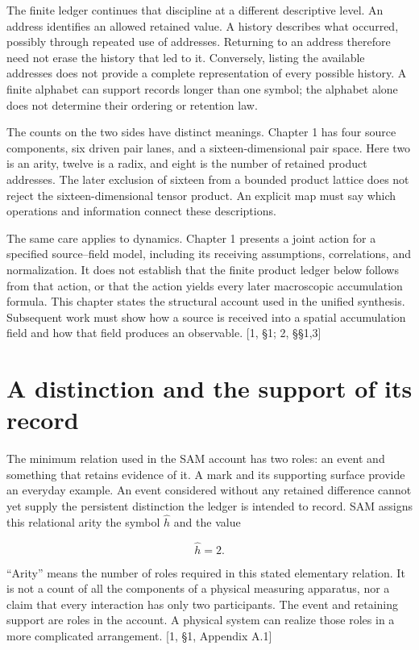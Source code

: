 \documentclass[10pt,twocolumn,letterpaper]{article}
\begin{document}
The finite ledger continues that discipline at a different descriptive level. An address identifies an allowed retained value. A history describes what occurred, possibly through repeated use of addresses. Returning to an address therefore need not erase the history that led to it. Conversely, listing the available addresses does not provide a complete representation of every possible history. A finite alphabet can support records longer than one symbol; the alphabet alone does not determine their ordering or retention law.

The counts on the two sides have distinct meanings. Chapter 1 has four source components, six driven pair lanes, and a sixteen-dimensional pair space. Here two is an arity, twelve is a radix, and eight is the number of retained product addresses. The later exclusion of sixteen from a bounded product lattice does not reject the sixteen-dimensional tensor product. An explicit map must say which operations and information connect these descriptions.

The same care applies to dynamics. Chapter 1 presents a joint action for a specified source--field model, including its receiving assumptions, correlations, and normalization. It does not establish that the finite product ledger below follows from that action, or that the action yields every later macroscopic accumulation formula. This chapter states the structural account used in the unified synthesis. Subsequent work must show how a source is received into a spatial accumulation field and how that field produces an observable. {[}1, §1; 2, §§1,3{]}

\section{A distinction and the support of its record}\label{a-distinction-and-the-support-of-its-record}

The minimum relation used in the SAM account has two roles: an event and something that retains evidence of it. A mark and its supporting surface provide an everyday example. An event considered without any retained difference cannot yet supply the persistent distinction the ledger is intended to record. SAM assigns this relational arity the symbol \(\hat h\) and the value

\begin{equation}
\hat h=2.
\end{equation}

``Arity'' means the number of roles required in this stated elementary relation. It is not a count of all the components of a physical measuring apparatus, nor a claim that every interaction has only two participants. The event and retaining support are roles in the account. A physical system can realize those roles in a more complicated arrangement. {[}1, §1, Appendix A.1{]}
\end{document}
